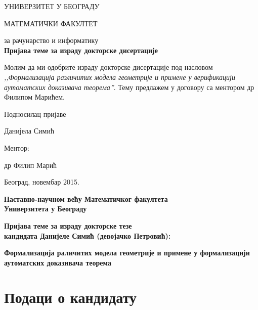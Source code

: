 \documentclass[11pt]{article}
\begin{document}
       УНИВЕРЗИТЕТ У БЕОГРАДУ  
       
       МАТЕМАТИЧКИ ФАКУЛТЕТ
 

\vspace{1cm}
\begin{center}
 { за рачунарство и информатику } \\[5mm]
 
 {\large\bf Пријава теме за израду докторске дисертације}
\end{center}

\vspace{1cm}
Молим да ми одобрите израду докторске дисертације под насловом
\textit{,,Формализација ра\-зли\-чи\-тих модела геометрије и примене у верификацији аутоматских доказивача 
теорема''}. Тему
предлажем у договору са ментором др Филипом Марићем.
  
  \vspace{1cm}
  
  \hfill{Подносилац пријаве} 
  
  \vspace{0.5cm}
  
  \hfill{\underline{\hspace{7cm}}} 
  
  \hfill{Данијела Симић} 
  
  \vspace{1cm}
  
  \hfill{Ментор:} 
  
  \hfill{др Филип Марић}

Београд, новембар 2015.
\thispagestyle{empty}

  
  \newpage
\setcounter{page}{1}  
\begin{center}
{\bf Наставно-научном већу Математичког факултета\\
Универзитета у Београду}

\vspace{1cm}

{\bf Пријава теме за израду докторске тезе \\
     кандидата Данијеле Симић (девојачко Петровић):}

\vspace{0.5cm}     

{\bf Формализација раличитих модела геометрије и примене у формализацији аутоматских доказивача теорема}
\end{center}

\section{Подаци о кандидату}
\end{document}
